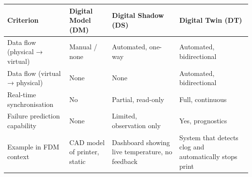 \begin{tabular}{|L{3.0cm}|C{3.0cm}|C{3.0cm}|C{3.0cm}|}
	\hline
	\textbf{Criterion} & \textbf{Digital Model (DM)} & \textbf{Digital Shadow (DS)} & \textbf{Digital Twin (DT)} \\
	\hline
	Data flow (physical → virtual) & Manual / none & Automated, one-way & Automated, bidirectional \\
	\hline
	Data flow (virtual → physical) & None & None & Automated, bidirectional \\
	\hline
	Real-time synchronisation & No & Partial, read-only & Full, continuous \\
	\hline
	Failure prediction capability & None & Limited, observation only & Yes, prognostics \\
	\hline
	Example in FDM context & CAD model of printer, static & Dashboard showing live temperature, no feedback & System that detects clog and automatically stops print \\
	\hline
\end{tabular}